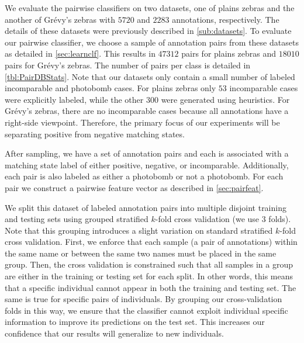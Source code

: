     We evaluate the pairwise classifiers on two datasets, one of plains zebras and the another of Grévy's zebras
      with $5720$ and $2283$ annotations, respectively.
    The details of these datasets were previously described in \cref{sub:datasets}.
    To evaluate our pairwise classifier, we choose a sample of annotation pairs from these datasets as detailed
      in \cref{sec:learnclf}.
    This results in $47312$ pairs for plains zebras and $18010$ pairs for Grévy's zebras.
    The number of pairs per class is detailed in \cref{tbl:PairDBStats}.
    Note that our datasets only contain a small number of labeled incomparable and photobomb cases.
    For plains zebras only $53$ incomparable cases were explicitly labeled, while the other $300$ were generated
      using heuristics.
    For Grévy's zebras, there are no incomparable cases because all annotations have a right-side viewpoint.
    Therefore, the primary focus of our experiments will be separating positive from negative matching states.

    \PairDBStats{}

    After sampling, we have a set of annotation pairs and each is associated with a \groundtruth{} matching state
      label of either positive, negative, or incomparable.
    Additionally, each pair is also labeled as either a photobomb or not a photobomb.
    For each pair we construct a pairwise feature vector as described in \cref{sec:pairfeat}.

    We split this dataset of labeled annotation pairs into multiple disjoint training and testing sets using
      grouped stratified $k$-fold cross validation (we use $3$ folds).
    Note that this grouping introduces a slight variation on standard stratified $k$-fold cross validation.
    First, we enforce that each sample (a pair of annotations) within the same name or between the same two names
      must be placed in the same group.
    Then, the cross validation is constrained such that all samples in a group are either in the training or
      testing set for each split.
    In other words, this means that a specific individual cannot appear in both the training and testing set.
    The same is true for specific pairs of individuals.
    By grouping our cross-validation folds in this way, we ensure that the classifier cannot exploit individual
      specific information to improve its predictions on the test set.
    This increases our confidence that our results will generalize to new individuals.

